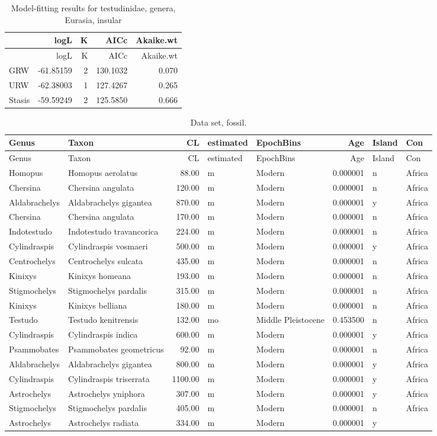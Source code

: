 \documentclass[]{article}
\begin{document}
\begin{longtable}[]{@{}lrrrr@{}}
\caption{Model-fitting results for testudinidae, genera, Eurasia,
insular}\tabularnewline
\toprule
& logL & K & AICc & Akaike.wt\tabularnewline
\midrule
\endfirsthead
\toprule
& logL & K & AICc & Akaike.wt\tabularnewline
\midrule
\endhead
GRW & -61.85159 & 2 & 130.1032 & 0.070\tabularnewline
URW & -62.38003 & 1 & 127.4267 & 0.265\tabularnewline
Stasis & -59.59249 & 2 & 125.5850 & 0.666\tabularnewline
\bottomrule
\end{longtable}

\begin{longtable}[]{@{}llrllrll@{}}
\caption{Data set, fossil.}\tabularnewline
\toprule
Genus & Taxon & CL & estimated & EpochBins & Age & Island &
Con\tabularnewline
\midrule
\endfirsthead
\toprule
Genus & Taxon & CL & estimated & EpochBins & Age & Island &
Con\tabularnewline
\midrule
\endhead
Homopus & Homopus aerolatus & 88.00 & m & Modern & 0.000001 & n &
Africa\tabularnewline
Chersina & Chersina angulata & 120.00 & m & Modern & 0.000001 & n &
Africa\tabularnewline
Aldabrachelys & Aldabrachelys gigantea & 870.00 & m & Modern & 0.000001
& y & Africa\tabularnewline
Chersina & Chersina angulata & 170.00 & m & Modern & 0.000001 & n &
Africa\tabularnewline
Indotestudo & Indotestudo travancorica & 224.00 & m & Modern & 0.000001
& n & Africa\tabularnewline
Cylindraspis & Cylindraspis vosmaeri & 500.00 & m & Modern & 0.000001 &
y & Africa\tabularnewline
Centrochelys & Centrochelys sulcata & 435.00 & m & Modern & 0.000001 & n
& Africa\tabularnewline
Kinixys & Kinixys homeana & 193.00 & m & Modern & 0.000001 & n &
Africa\tabularnewline
Stigmochelys & Stigmochelys pardalis & 315.00 & m & Modern & 0.000001 &
n & Africa\tabularnewline
Kinixys & Kinixys belliana & 180.00 & m & Modern & 0.000001 & n &
Africa\tabularnewline
Testudo & Testudo kenitrensis & 132.00 & mo & Middle Pleistocene &
0.453500 & n & Africa\tabularnewline
Cylindraspis & Cylindraspis indica & 600.00 & m & Modern & 0.000001 & y
& Africa\tabularnewline
Psammobates & Psammobates geometricus & 92.00 & m & Modern & 0.000001 &
n & Africa\tabularnewline
Aldabrachelys & Aldabrachelys gigantea & 800.00 & m & Modern & 0.000001
& y & Africa\tabularnewline
Cylindraspis & Cylindraspis triserrata & 1100.00 & m & Modern & 0.000001
& y & Africa\tabularnewline
Astrochelys & Astrochelys yniphora & 307.00 & m & Modern & 0.000001 & y
& Africa\tabularnewline
Stigmochelys & Stigmochelys pardalis & 405.00 & m & Modern & 0.000001 &
n & Africa\tabularnewline
Astrochelys & Astrochelys radiata & 334.00 & m & Modern & 0.000001 & y &

\end{longtable}
\end{document}
